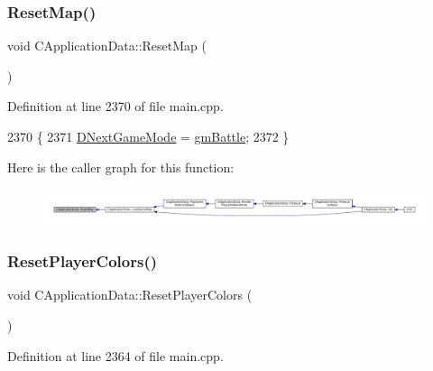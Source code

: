 \subsubsection{\texorpdfstring{Reset\+Map()}{ResetMap()}}
{\footnotesize\ttfamily void C\+Application\+Data\+::\+Reset\+Map (\begin{DoxyParamCaption}{ }\end{DoxyParamCaption})\hspace{0.3cm}{\ttfamily [protected]}}



Definition at line 2370 of file main.\+cpp.


\begin{DoxyCode}
2370                                \{
2371     \hyperlink{classCApplicationData_a3b67edeacd70201dcf96fa9fa8aa2107}{DNextGameMode} = \hyperlink{classCApplicationData_ac8ac37a4c8bb871036fbbdc6a072e403a00a1759bd54eaaa07aab7575dbae51fc}{gmBattle};
2372 \}
\end{DoxyCode}
Here is the caller graph for this function\+:
\nopagebreak
\begin{figure}[H]
\begin{center}
\leavevmode
\includegraphics[width=350pt]{classCApplicationData_a18ae4aed31d9ef2416059e66babb05b0_icgraph}
\end{center}
\end{figure}
\hypertarget{classCApplicationData_a46653e8a3ed079f3921ec0257e49eb89}{}\label{classCApplicationData_a46653e8a3ed079f3921ec0257e49eb89} 
\subsubsection{\texorpdfstring{Reset\+Player\+Colors()}{ResetPlayerColors()}}
{\footnotesize\ttfamily void C\+Application\+Data\+::\+Reset\+Player\+Colors (\begin{DoxyParamCaption}{ }\end{DoxyParamCaption})\hspace{0.3cm}{\ttfamily [protected]}}



Definition at line 2364 of file main.\+cpp.


